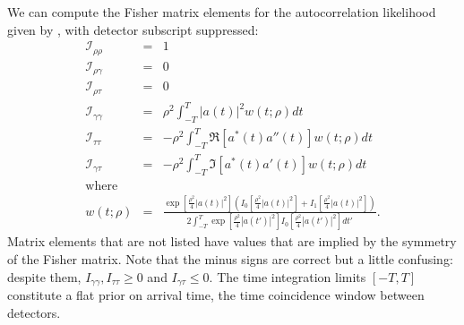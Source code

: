 \documentclass{iopart}
\begin{document}
We can compute the Fisher matrix elements for the autocorrelation likelihood given by , with detector subscript suppressed:
%
\begin{eqnarray}
    \nonumber
    \mathcal{I}_{\rho\rho} &=& 1 \\
    \nonumber
    \mathcal{I}_{\rho\gamma} &=& 0 \\
    \nonumber
    \mathcal{I}_{\rho\tau} &=& 0 \\
    \label{eq:fisher-autocor-gamma-gamma}
    \mathcal{I}_{\gamma\gamma} &=& \rho^2
        \int_{-T}^T \left|a(t)\right|^2 w(t; \rho) dt \\
    \label{eq:fisher-autocor-tau-tau}
    \mathcal{I}_{\tau\tau} &=& -\rho^2
        \int_{-T}^T \Re\left[a^*(t) a''(t)\right] w(t; \rho) dt \\
    \label{eq:fisher-autocor-gamma-tau}
    \mathcal{I}_{\gamma\tau} &=& -\rho^2
        \int_{-T}^T \Im\left[a^*(t) a'(t)\right] w(t; \rho) dt \\
    \nonumber\textrm{where} && \\
    w(t; \rho) &=& \frac{
        \displaystyle
        \exp\left[\frac{\rho^2}{4}\left|a(t)\right|^2\right]
        \left(
        I_0\left[\frac{\rho^2}{4}\left|a(t)\right|^2\right] +
        I_1\left[\frac{\rho^2}{4}\left|a(t)\right|^2\right]
        \right)
    }{
        \displaystyle
        2 \int_{-T}^T
        \exp\left[\frac{\rho^2}{4}\left|a(t')\right|^2\right]
        I_0\left[\frac{\rho^2}{4}\left|a(t')\right|^2\right]
        dt'
    }.
\end{eqnarray}
%
Matrix elements that are not listed have values that are implied by the symmetry of the Fisher matrix. Note that the minus signs are correct but a little confusing: despite them, ${I}_{\gamma\gamma}, {I}_{\tau\tau} \geq 0$ and ${I}_{\gamma\tau} \leq 0$. The time integration limits $[-T, T]$ constitute a flat prior on arrival time, the time coincidence window between detectors.
\end{document}
